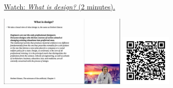 
\begin{minipage}{10cm}
    \href{https://act4e-spring21.netlify.app/videos/spring2021-design:design:def-design.html}{Watch: \emph{What is design?} (2 minutes).}
        
    \href{https://act4e-spring21.netlify.app/videos/spring2021-design:design:def-design.html}{\includegraphics[height=3.5cm]{spring2021-design:design:def-design/thumbnails.jpg}}
    \href{https://act4e-spring21.netlify.app/videos/spring2021-design:design:def-design.html}{\includegraphics[height=2.5cm]{spring2021-design:design:def-design/qrcode.png}}
\end{minipage}
